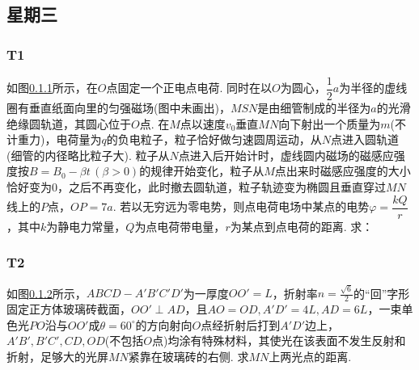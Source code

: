 \documentclass[UTF8,a4paper,11 pt]{ctexart}%
\begin{document}
	\subsection{星期三}
	\subsubsection{T1}\label{431}\noindent
	如图\ref{431}\:所示，在$ O $点固定一个正电点电荷. 同时在以$ O $为圆心，$ \dfrac{1}{2}a $为半径的虚线圈有垂直纸面向里的匀强磁场(图中未画出)，$ MSN $是由细管制成的半径为$ a $的光滑绝缘圆轨道，其圆心位于$ O $点. 在$ M $点以速度$ v_0 $垂直$ MN $向下射出一个质量为$ m $(不计重力)，电荷量为$ q $的负电粒子，粒子恰好做匀速圆周运动，从$ N $点进入圆轨道(细管的内径略比粒子大). 粒子从$ N $点进入后开始计时，虚线圆内磁场的磁感应强度按$ B=B_0-\beta t\,(\beta>0) $的规律开始变化，粒子从$ M $点出来时磁感应强度的大小恰好变为0，之后不再变化，此时撤去圆轨道，粒子轨迹变为椭圆且垂直穿过$ MN $线上的$ P $点，$ OP=7a $. 若以无穷远为零电势，则点电荷电场中某点的电势$ \varphi=\dfrac{kQ}{r}$，其中$  k$为静电力常量，$ Q $为点电荷带电量，$ r $为某点到点电荷的距离. 求：
	\clearpage\subsubsection{T2}\label{432}\noindent
	如图\ref{432}\:所示，$ ABCD-A'B'C'D' $为一厚度$ OO'=L $，折射率$ n=\frac{\sqrt{6}}{2} $的“回”字形固定正方体玻璃砖截面，$ OO' \perp AD $，且$ AO=OD , A'D'=4L ,AD=6L$，一束单色光$ PO $沿与$ OO' $成$ θ=60^\circ $的方向射向$ O $点经折射后打到$ A'D' $边上，$ A'B',B'C',CD,OD $(不包括$ O $点)均涂有特殊材料，其使光在该表面不发生反射和折射，足够大的光屏$ MN $紧靠在玻璃砖的右侧. 求$ MN $上两光点的距离.
\end{document}
